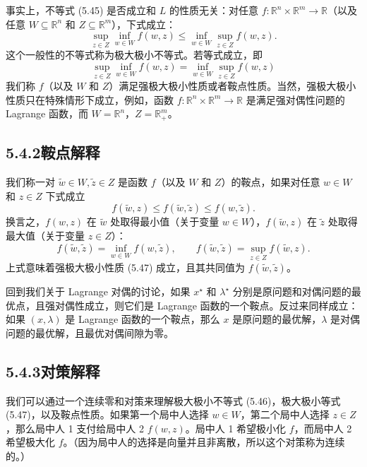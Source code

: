 \documentclass[UTF8, 12pt, fontset=fandol, oneside]{ctexart}
\begin{document}
事实上，不等式 (5.45) 是否成立和 $L$ 的性质无关：对任意 $f:\mathbb{R}^n\times\mathbb{R}^m\to\mathbb{R}$（以及任意 $W\subseteq\mathbb{R}^n$ 和 $Z\subseteq\mathbb{R}^m$），下式成立：
\begin{equation}
\sup_{z\in Z}\inf_{w\in W} f(w,z)\leq \inf_{w\in W}\sup_{z\in Z} f(w,z).
\tag{5.46}
\end{equation}
这个一般性的不等式称为极大极小不等式。若等式成立，即
\begin{equation}
\sup_{z\in Z}\inf_{w\in W} f(w,z)=\inf_{w\in W}\sup_{z\in Z} f(w,z)
\tag{5.47}
\end{equation}
我们称 $f$（以及 $W$ 和 $Z$）满足强极大极小性质或者鞍点性质。当然，强极大极小性质只在特殊情形下成立，例如，函数 $f:\mathbb{R}^n\times\mathbb{R}^m\to\mathbb{R}$ 是满足强对偶性问题的 Lagrange 函数，而 $W=\mathbb{R}^n$，$Z=\mathbb{R}_+^m$。

\subsection*{5.4.2\quad 鞍点解释}

我们称一对 $\tilde{w}\in W,\tilde{z}\in Z$ 是函数 $f$（以及 $W$ 和 $Z$）的鞍点，如果对任意 $w\in W$ 和 $z\in Z$ 下式成立
\[
f(\tilde{w},z)\leq f(\tilde{w},\tilde{z})\leq f(w,\tilde{z}).
\]
换言之，$f(w,z)$ 在 $\tilde{w}$ 处取得最小值（关于变量 $w\in W$），$f(\tilde{w},z)$ 在 $\tilde{z}$ 处取得最大值（关于变量 $z\in Z$）：
\[
f(\tilde{w},\tilde{z})=\inf_{w\in W} f(w,\tilde{z}),\qquad
f(\tilde{w},\tilde{z})=\sup_{z\in Z} f(\tilde{w},z).
\]
上式意味着强极大极小性质 (5.47) 成立，且其共同值为 $f(\tilde{w},\tilde{z})$。

回到我们关于 Lagrange 对偶的讨论，如果 $x^\star$ 和 $\lambda^\star$ 分别是原问题和对偶问题的最优点，且强对偶性成立，则它们是 Lagrange 函数的一个鞍点。反过来同样成立：如果 $(x,\lambda)$ 是 Lagrange 函数的一个鞍点，那么 $x$ 是原问题的最优解，$\lambda$ 是对偶问题的最优解，且最优对偶间隙为零。

\subsection*{5.4.3\quad 对策解释}

我们可以通过一个连续零和对策来理解极大极小不等式 (5.46)，极大极小等式 (5.47)，以及鞍点性质。如果第一个局中人选择 $w\in W$，第二个局中人选择 $z\in Z$，那么局中人 1 支付给局中人 2 $f(w,z)$。局中人 1 希望极小化 $f$，而局中人 2 希望极大化 $f$。（因为局中人的选择是向量并且非离散，所以这个对策称为连续的。）
\end{document}
